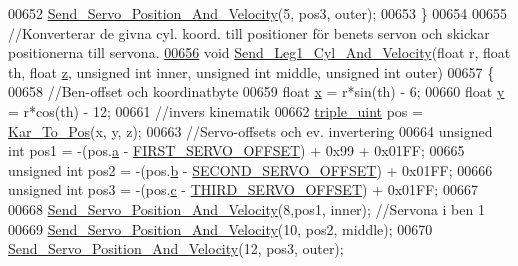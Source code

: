 \begin{DoxyCode}
00652     \hyperlink{servo___u_a_r_t_8c_aef28545296037ecc0350638a407a680f}{Send\_Servo\_Position\_And\_Velocity}(5, pos3, outer);
00653 \}
00654 
00655 \textcolor{comment}{//Konverterar de givna cyl. koord. till positioner för benets servon och skickar positionerna till servona.}
\hypertarget{servo___u_a_r_t_8c_source.tex_l00656}{}\hyperlink{servo___u_a_r_t_8h_a7783d05fa4457ed256d04d0eac4713cc}{00656} \textcolor{keywordtype}{void} \hyperlink{servo___u_a_r_t_8c_a7783d05fa4457ed256d04d0eac4713cc}{Send\_Leg1\_Cyl\_And\_Velocity}(\textcolor{keywordtype}{float} r, \textcolor{keywordtype}{float} th, \textcolor{keywordtype}{float} 
      \hyperlink{over__hinder_8c_af73583b1e980b0aa03f9884812e9fd4d}{z}, \textcolor{keywordtype}{unsigned} \textcolor{keywordtype}{int} inner, \textcolor{keywordtype}{unsigned} \textcolor{keywordtype}{int} middle, \textcolor{keywordtype}{unsigned} \textcolor{keywordtype}{int} outer)
00657 \{
00658     \textcolor{comment}{//Ben-offset och koordinatbyte}
00659     \textcolor{keywordtype}{float} \hyperlink{sensor_8h_a6c4b361d72eb3767ba424ac9a6ecf52b}{x} = r*sin(th) - 6;
00660     \textcolor{keywordtype}{float} \hyperlink{sensor_8h_a0ed6a908288e0cd87f79c1b5ab56d07c}{y} = r*cos(th) - 12;
00661     \textcolor{comment}{//invers kinematik }
00662     \hyperlink{structtriple__uint}{triple\_uint} pos = \hyperlink{invers__kinematik_8c_a68f82386196ad991ed54fb9796d90f7c}{Kar\_To\_Pos}(x, y, z);
00663     \textcolor{comment}{//Servo-offsets och ev. invertering }
00664     \textcolor{keywordtype}{unsigned} \textcolor{keywordtype}{int} pos1 = -(pos.\hyperlink{structtriple__uint_a0ea8a85723620c90be9fd2a693f12a59}{a} - \hyperlink{servo___u_a_r_t_8c_a4c437d01d2f060ec86c16ed5e76efe45}{FIRST\_SERVO\_OFFSET}) + 0x99 + 0x01FF;
00665     \textcolor{keywordtype}{unsigned} \textcolor{keywordtype}{int} pos2 = -(pos.\hyperlink{structtriple__uint_a790d5baa17ec7aaf7bb49750a16e9c29}{b} - \hyperlink{servo___u_a_r_t_8c_acb02dedbe5ff19694bdb5b2ddf61664a}{SECOND\_SERVO\_OFFSET}) + 0x01FF;
00666     \textcolor{keywordtype}{unsigned} \textcolor{keywordtype}{int} pos3 = -(pos.\hyperlink{structtriple__uint_a6ce17b018c47d0f1d0e53a458f741ad3}{c} - \hyperlink{servo___u_a_r_t_8c_ac2f065c44b617c91ea7f4237e8ead729}{THIRD\_SERVO\_OFFSET}) + 0x01FF;
00667     
00668     \hyperlink{servo___u_a_r_t_8c_aef28545296037ecc0350638a407a680f}{Send\_Servo\_Position\_And\_Velocity}(8,pos1, inner); \textcolor{comment}{//Servona i ben 1}
00669     \hyperlink{servo___u_a_r_t_8c_aef28545296037ecc0350638a407a680f}{Send\_Servo\_Position\_And\_Velocity}(10, pos2, middle);
00670     \hyperlink{servo___u_a_r_t_8c_aef28545296037ecc0350638a407a680f}{Send\_Servo\_Position\_And\_Velocity}(12, pos3, outer);

\end{DoxyCode}
